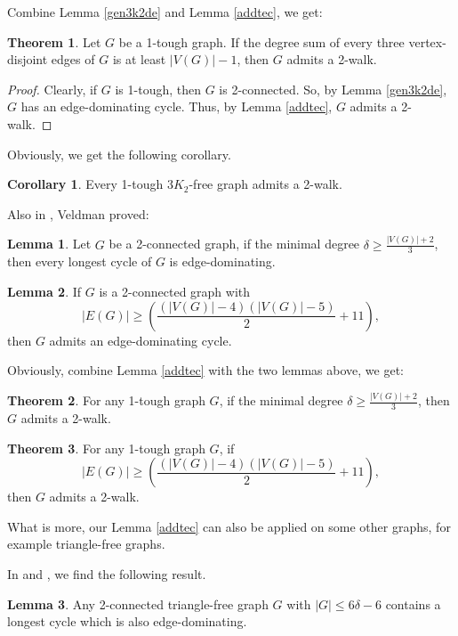 \documentclass{amsart}
\theoremstyle{definition}
\newtheorem{theorem}{Theorem}
\newtheorem{corollary}{Corollary}
\newtheorem{lemma}{Lemma}
\begin{document}
Combine Lemma \ref{gen3k2de} and Lemma \ref{addtec}, we get:

\begin{theorem}\label{2w3k2f}
Let $G$ be a 1-tough graph. If the degree sum of every three vertex-disjoint edges of $G$ is at least $|V(G)|-1$, then $G$ admits a 2-walk.
\end{theorem}

\begin{proof}
Clearly, if $G$ is 1-tough, then $G$ is 2-connected. So, by Lemma \ref{gen3k2de}, $G$ has an edge-dominating cycle. Thus, by Lemma \ref{addtec}, $G$ admits a 2-walk.
\end{proof}

Obviously, we get the following corollary.
\begin{corollary}
Every 1-tough $3K_2$-free graph admits a 2-walk.
\end{corollary}

Also in \cite{veldman83}, Veldman proved:

\begin{lemma}\label{lemdelta}{\cite[Theorem C]{veldman83}}
Let $G$ be a 2-connected graph, if the minimal degree $\delta\ge\frac{|V(G)|+2}{3}$, then every longest cycle of $G$ is edge-dominating.
\end{lemma}

\begin{lemma}\label{2conxiaoe}{\cite[Corollary 3.3.1]{veldman83}}
If $G$ is a 2-connected graph with $$|E(G)|\ge(\frac{(|V(G)|-4)(|V(G)|-5)}{2}+11),$$ then $G$ admits an edge-dominating cycle.
\end{lemma}

Obviously, combine Lemma \ref{addtec} with the two lemmas above, we get:

\begin{theorem}\label{mdeg2w}
For any 1-tough graph $G$, if the minimal degree $\delta\ge\frac{|V(G)|+2}{3}$, then $G$ admits a 2-walk.
\end{theorem}


\begin{theorem}
For any 1-tough graph $G$, if $$|E(G)|\ge(\frac{(|V(G)|-4)(|V(G)|-5)}{2}+11),$$ then $G$ admits a 2-walk.
\end{theorem}



What is more, our Lemma \ref{addtec} can also be applied on some other graphs, for example triangle-free graphs.

In \cite{aung1989longest} and \cite{ozeki2011dominating}, we find the following result.
\begin{lemma}\cite[Corollary 1.4]{aung1989longest}\label{lm89tr}
Any 2-connected triangle-free graph $G$ with $|G|\le6\delta-6$ contains a longest cycle which is also edge-dominating.
\end{lemma}
\end{document}
